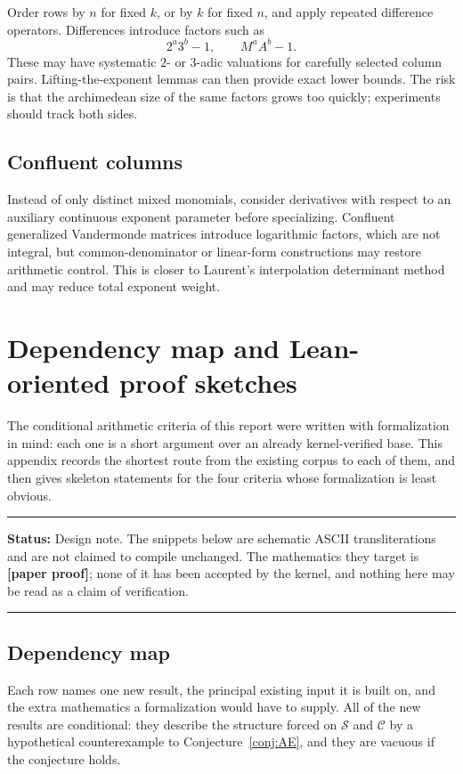 \documentclass[11pt,oneside]{article}
\theoremstyle{definition}
\theoremstyle{remark}
\newcommand{\Sol}{\mathcal S}
\newcommand{\Cand}{\mathcal C}
\newcommand{\statusnew}{\textcolor{newgreen}{\textbf{[paper proof]}}}
\newenvironment{statusbox}[1]
{\begin{center}\begin{minipage}{0.94\textwidth}\raggedright\hbadness=10000\hrule
\vspace{0.45em}\textbf{Status:} #1\par\vspace{0.35em}}
{\vspace{0.35em}\hrule\end{minipage}\end{center}}
\begin{document}
Order rows by $n$ for fixed $k$, or by $k$ for fixed $n$, and apply repeated difference
operators.  Differences introduce factors such as
\[
 2^a3^b-1,
 \qquad
 M^aA^b-1.
\]
These may have systematic $2$- or $3$-adic valuations for carefully selected column pairs.
Lifting-the-exponent lemmas can then provide exact lower bounds.  The risk is that the
archimedean size of the same factors grows too quickly; experiments should track both sides.

\subsection{Confluent columns}

Instead of only distinct mixed monomials, consider derivatives with respect to an auxiliary
continuous exponent parameter before specializing.  Confluent generalized Vandermonde
matrices introduce logarithmic factors, which are not integral, but common-denominator or
linear-form constructions may restore arithmetic control.  This is closer to Laurent's
interpolation determinant method \cite{Waldschmidt2000} and may reduce total exponent weight.

\section{Dependency map and Lean-oriented proof sketches}
\label{app:sketches}

The conditional arithmetic criteria of this report were written with formalization in mind:
each one is a short argument over an already kernel-verified base.  This appendix records the
shortest route from the existing corpus to each of them, and then gives skeleton statements
for the four criteria whose formalization is least obvious.

\begin{statusbox}{Design note.  The snippets below are schematic ASCII transliterations and
are not claimed to compile unchanged.  The mathematics they target is \statusnew{}; none of
it has been accepted by the kernel, and nothing here may be read as a claim of verification.}
\end{statusbox}

\subsection{Dependency map}
\label{a3:depmap}

Each row names one new result, the principal existing input it is built on, and the extra
mathematics a formalization would have to supply.  All of the new results are conditional:
they describe the structure forced on $\Sol$ and $\Cand$ by a hypothetical counterexample to
Conjecture~\ref{conj:AE}, and they are vacuous if the conjecture holds.
\end{document}
